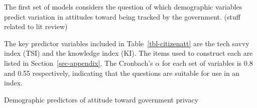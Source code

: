 \documentclass[
  letterpaper,
  DIV=11,
  numbers=noendperiod]{scrartcl}
\begin{document}
The first set of models considers the question of which demographic
variables predict variation in attitudes toward being tracked by the
government. (stuff related to lit review)

The key predictor variables included in Table~\ref{tbl-citizenatt} are
the tech savvy index (TSI) and the knowledge index (KI). The items used
to construct each are listed in Section~\ref{sec-appendix}. The
Cronbach's \(\alpha\) for each set of variables is 0.8 and 0.55
respectively, indicating that the questions are suitable for use in an
index.

\begin{table}

\caption{\label{tbl-citizenatt}Demographic predictors of attitude toward
government privacy}

\centering{

}
\end{table}
\end{document}
